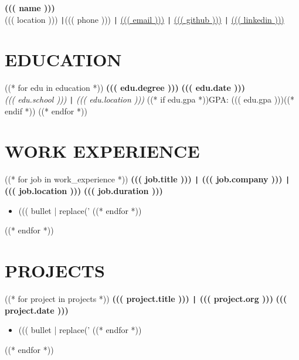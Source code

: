 \documentclass[10pt]{article}
\begin{document}
\begin{center}
    \textbf{\fontsize{18}{18}\selectfont ((( name )))} \\
    ((( location ))) \texttt{|}((( phone ))) \texttt{|} \href{mailto:((( email )))}{((( email )))} \texttt{|}
    \href{((( github )))}{((( github )))} \texttt{|}  
    \href{((( linkedin )))}{((( linkedin )))}
\end{center}

\vspace{-0.7cm}
\section*{EDUCATION} 
\vspace{-0.2cm} 
((* for edu in education *))
\noindent 
\textbf{((( edu.degree )))} \hfill \textbf{((( edu.date )))} \\
\textit{((( edu.school )))} \texttt{|} \textit{((( edu.location )))} ((* if edu.gpa *))\hfill GPA: ((( edu.gpa )))((* endif *))
((* endfor *))


\vspace{-0.4cm}
\section*{WORK EXPERIENCE}
((* for job in work_experience *))
\vspace{-0.2cm}
\noindent
\textbf{((( job.title ))) \texttt{|} ((( job.company ))) \texttt{|} ((( job.location )))} \hfill \textbf{((( job.duration )))} 
\vspace{-0.15cm}
\begin{itemize}[leftmargin=0.5cm, itemsep=0pt]
((* for bullet in job.bullets *))
    \item ((( bullet | replace('%
((* endfor *))
\end{itemize}
((* endfor *))

\vspace{-0.75cm}
\section*{PROJECTS}
\vspace{-0.1cm}
((* for project in projects *))
\noindent
\textbf{((( project.title ))) \texttt{|} ((( project.org )))} \hfill \textbf{((( project.date )))} \\
\vspace{-0.4cm}
\begin{itemize}[leftmargin=0.6cm, itemsep=-0.1cm, topsep=0cm]
((* for bullet in project.bullets *))
    \item ((( bullet | replace('%
((* endfor *))
\end{itemize}
((* endfor *))
\end{document}
